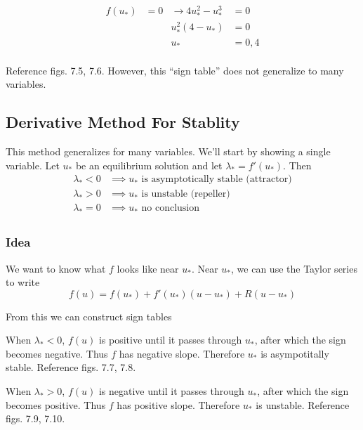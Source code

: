 \documentclass[12pt,twoside]{article}
\begin{document}
\begin{equation}
  \begin{aligned}
    f(u_*) &= 0 &\rightarrow 4u_*^2-u_*^3 &= 0 \\
    & & u_*^2(4-u_*) &= 0 \\
    & & u_* &= 0, 4 \\
  \end{aligned}
\end{equation}

Reference figs. 7.5, 7.6. However, this ``sign table'' does not generalize to
many variables.

\subsection{Derivative Method For Stablity}
\label{sec:derivative-method}
This method generalizes for many variables. We'll start by showing a single
variable. Let $u_*$ be an equilibrium solution and let $\lambda_*=f'(u_*)$.
Then
\begin{equation}
  \begin{aligned}
    \lambda_* < 0 &\implies u_* \text{ is asymptotically stable (attractor)} \\
    \lambda_* > 0 &\implies u_* \text{ is unstable (repeller)} \\
    \lambda_* = 0 &\implies u_* \text{ no conclusion} \\
  \end{aligned}
\end{equation}

\subsubsection*{Idea}
We want to know what $f$ looks like near $u_*$. Near $u_*$, we can use the
Taylor series to write
\begin{equation}
  f(u) = f(u_*) + f'(u_*)(u-u_*) + R(u-u_*)
\end{equation}


From this we can construct sign tables

When $\lambda_*<0$, $f(u)$ is positive until it passes through $u_*$, after
which the sign becomes negative. Thus $f$ has negative slope. Therefore $u_*$ is
asympotitally stable. Reference figs. 7.7, 7.8.

When $\lambda_*>0$, $f(u)$ is negative until it passes through $u_*$, after
which the sign becomes positive. Thus $f$ has positive slope. Therefore $u_*$
is unstable. Reference figs. 7.9, 7.10.
\end{document}

